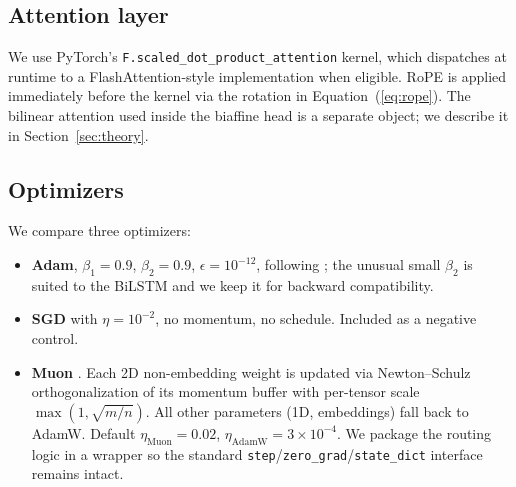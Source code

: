 \subsection{Attention layer}
\label{sec:method-attention}

We use PyTorch's \texttt{F.scaled\_dot\_product\_attention} kernel, which dispatches at runtime to a FlashAttention-style implementation when eligible. RoPE is applied immediately before the kernel via the rotation in Equation~(\ref{eq:rope}). The bilinear attention used inside the biaffine head is a separate object; we describe it in Section~\ref{sec:theory}.

\subsection{Optimizers}
\label{sec:method-optimizer}

We compare three optimizers:
\begin{itemize}[leftmargin=*, itemsep=2pt]
  \item \textbf{Adam}, $\beta_1{=}0.9$, $\beta_2{=}0.9$, $\epsilon{=}10^{-12}$, following \citet{dozat2017biaffine}; the unusual small $\beta_2$ is suited to the BiLSTM and we keep it for backward compatibility.
  \item \textbf{SGD} with $\eta{=}10^{-2}$, no momentum, no schedule. Included as a negative control.
  \item \textbf{Muon} \citep{jordan2024muon}. Each 2D non-embedding weight is updated via Newton--Schulz orthogonalization of its momentum buffer with per-tensor scale $\max(1,\sqrt{m/n})$. All other parameters (1D, embeddings) fall back to AdamW. Default $\eta_{\text{Muon}}{=}0.02$, $\eta_{\text{AdamW}}{=}3{\times}10^{-4}$. We package the routing logic in a wrapper so the standard \texttt{step}/\texttt{zero\_grad}/\texttt{state\_dict} interface remains intact.
\end{itemize}
